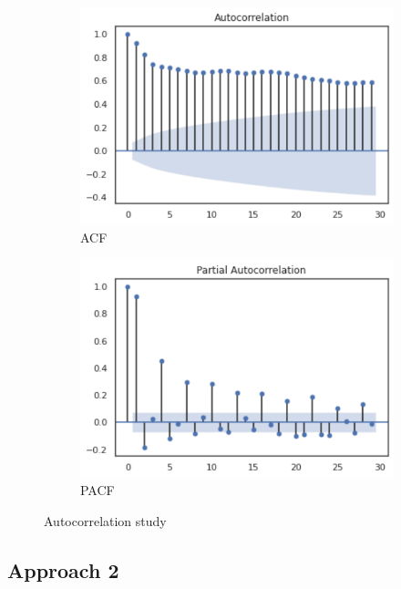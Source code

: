 \begin{figure}[h]
\centering

    \begin{subfigure}{0.49\textwidth}
    \centering
    \includegraphics[width=\linewidth]{figures/Ch4/Trend_autocorr.pdf}
    \caption{ACF}
    \label{f:auto}
    \end{subfigure}
\hfill
    \begin{subfigure}{0.49\textwidth}
    \centering
    \includegraphics[width=\linewidth]{figures/Ch4/Trend_Partial_autocorr.pdf}
    \caption{PACF}
    \label{f:partial}
    \end{subfigure}

\caption{Autocorrelation study}
\label{f:autocorrelation}
\end{figure}

\subsection{Approach 2}
\label{s:Approach2}


